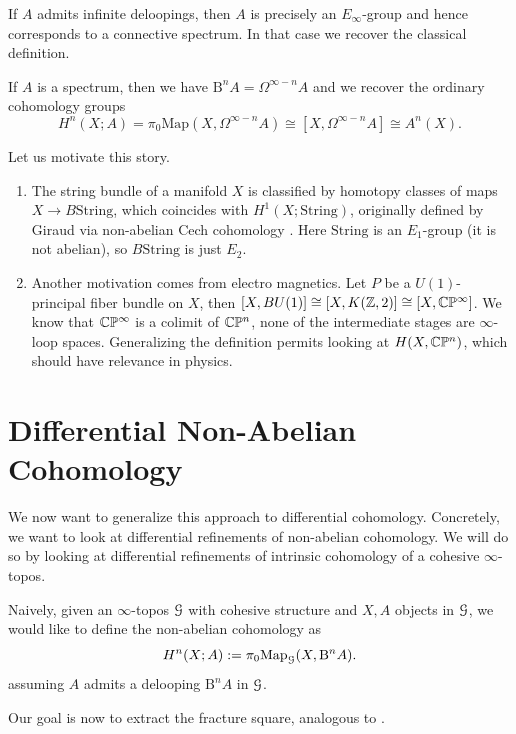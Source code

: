 \documentclass[10pt]{amsart}
\begin{document}
If $A$ admits infinite deloopings, then $A$ is precisely an $E_\infty$-group and hence corresponds to a connective spectrum. In that case we recover the classical definition.


\begin{remark}
	If $A$ is a spectrum, then we have $\mathrm{B}^n A = \Omega^{\infty - n} A$ and we recover the ordinary cohomology groups
	\[	H^n(X; A) = \pi_0 \mathrm{Map}(X, \Omega^{\infty - n} A) \cong [X, \Omega^{\infty - n} A] \cong A^n(X). \]
\end{remark}

Let us motivate this story.

\begin{remark} \label{rem:motivation}
	\begin{enumerate}
		\item The string bundle of a manifold $X$ is classified by homotopy classes of maps $X \to B \mathrm{String}$, which coincides with $H^1(X; \mathrm{String})$, originally defined by Giraud via non-abelian Cech cohomology \cite{giraud1971cohnonabelian}. Here $\mathrm{String}$ is an $E_1$-group (it is not abelian), so $B\mathrm{String}$ is just $E_2$.
		\item Another motivation comes from electro magnetics. Let $P$ be a $U(1)$-principal fiber bundle on $X$, then $[X,BU(1)] \cong [X, K(\mathbb{Z},2)] \cong [X,\mathbb{C}\mathbb{P}^\infty]$. We know that $\mathbb{C}\mathbb{P}^\infty$ is a colimit of $\mathbb{C}\mathbb{P}^n$, none of the intermediate stages are $\infty$-loop spaces. Generalizing the definition permits looking at $H(X,\mathbb{C}\mathbb{P}^n)$, which should have relevance in physics.
	\end{enumerate}
\end{remark}
	
\section{Differential Non-Abelian Cohomology}
We now want to generalize this approach to differential cohomology. Concretely, we want to look at differential refinements of non-abelian cohomology. We will do so by looking at differential refinements of intrinsic cohomology of a cohesive $\infty$-topos.

Naively, given an $\infty$-topos $\mathcal{G}$ with cohesive structure and $X,A$ objects in $\mathcal{G}$, we would like to define the non-abelian cohomology as 
\[ H^n(X; A) := \pi_0 \mathrm{Map}_{\mathcal{G}}(X, \mathrm{B}^n A). \]
assuming $A$ admits a delooping $\mathrm{B}^n A$ in $\mathcal{G}$.

Our goal is now to extract the fracture square, analogous to \cite{bunkenikolausvoelkl2016diffcoh}. 
\end{document}
